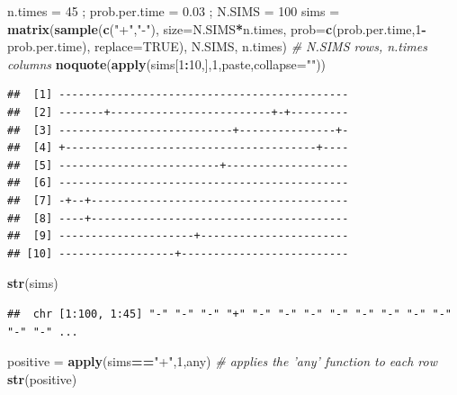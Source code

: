 \documentclass[]{book}
\newenvironment{Shaded}{\begin{snugshade}}{\end{snugshade}}
\newcommand{\CommentTok}[1]{\textcolor[rgb]{0.56,0.35,0.01}{\textit{#1}}}
\newcommand{\DataTypeTok}[1]{\textcolor[rgb]{0.13,0.29,0.53}{#1}}
\newcommand{\DecValTok}[1]{\textcolor[rgb]{0.00,0.00,0.81}{#1}}
\newcommand{\FloatTok}[1]{\textcolor[rgb]{0.00,0.00,0.81}{#1}}
\newcommand{\KeywordTok}[1]{\textcolor[rgb]{0.13,0.29,0.53}{\textbf{#1}}}
\newcommand{\NormalTok}[1]{#1}
\newcommand{\OperatorTok}[1]{\textcolor[rgb]{0.81,0.36,0.00}{\textbf{#1}}}
\newcommand{\OtherTok}[1]{\textcolor[rgb]{0.56,0.35,0.01}{#1}}
\newcommand{\StringTok}[1]{\textcolor[rgb]{0.31,0.60,0.02}{#1}}
\begin{document}
\begin{Shaded}
\begin{Highlighting}[]
\NormalTok{n.times =}\StringTok{ }\DecValTok{45}\NormalTok{ ; prob.per.time =}\StringTok{ }\FloatTok{0.03}\NormalTok{ ; N.SIMS =}\StringTok{ }\DecValTok{100}
\NormalTok{sims =}\StringTok{ }\KeywordTok{matrix}\NormalTok{(}\KeywordTok{sample}\NormalTok{(}\KeywordTok{c}\NormalTok{(}\StringTok{"+"}\NormalTok{,}\StringTok{"-"}\NormalTok{),}
                     \DataTypeTok{size=}\NormalTok{N.SIMS}\OperatorTok{*}\NormalTok{n.times,}
                     \DataTypeTok{prob=}\KeywordTok{c}\NormalTok{(prob.per.time,}\DecValTok{1}\OperatorTok{-}\NormalTok{prob.per.time),}
                     \DataTypeTok{replace=}\OtherTok{TRUE}\NormalTok{),}
\NormalTok{              N.SIMS, n.times) }\CommentTok{# N.SIMS rows, n.times columns}
\KeywordTok{noquote}\NormalTok{(}\KeywordTok{apply}\NormalTok{(sims[}\DecValTok{1}\OperatorTok{:}\DecValTok{10}\NormalTok{,],}\DecValTok{1}\NormalTok{,paste,}\DataTypeTok{collapse=}\StringTok{""}\NormalTok{))}
\end{Highlighting}
\end{Shaded}

\begin{verbatim}
##  [1] ---------------------------------------------
##  [2] -------+-------------------------+-+---------
##  [3] ---------------------------+---------------+-
##  [4] +---------------------------------------+----
##  [5] -------------------------+-------------------
##  [6] ---------------------------------------------
##  [7] -+--+----------------------------------------
##  [8] ----+----------------------------------------
##  [9] ---------------------+-----------------------
## [10] ------------------+--------------------------
\end{verbatim}

\begin{Shaded}
\begin{Highlighting}[]
\KeywordTok{str}\NormalTok{(sims)}
\end{Highlighting}
\end{Shaded}

\begin{verbatim}
##  chr [1:100, 1:45] "-" "-" "-" "+" "-" "-" "-" "-" "-" "-" "-" "-" "-" "-" ...
\end{verbatim}

\begin{Shaded}
\begin{Highlighting}[]
\NormalTok{positive =}\StringTok{ }\KeywordTok{apply}\NormalTok{(sims}\OperatorTok{==}\StringTok{"+"}\NormalTok{,}\DecValTok{1}\NormalTok{,any)  }\CommentTok{# applies the 'any' function to each row}
\KeywordTok{str}\NormalTok{(positive)}
\end{Highlighting}
\end{Shaded}
\end{document}
